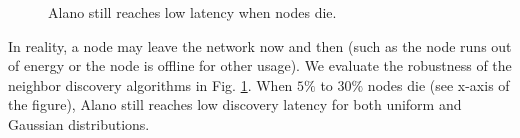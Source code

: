 \begin{figure}[!h]
\centering
{}
\hspace{0.01in}
\caption{Alano still reaches low latency when nodes die.}
\label{fig_robust}
\end{figure}

In reality, a node may leave the network now and then (such as the node runs out of energy or the node is offline for other usage). We evaluate the robustness of the neighbor discovery algorithms in Fig. \ref{fig_robust}. When $5\%$ to $30\%$ nodes die (see x-axis of the figure), Alano still reaches low discovery latency for both uniform and Gaussian distributions. %
